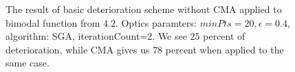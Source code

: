 \begin{figure}
  \centering
  \caption{The result of basic deterioration scheme without CMA 
  applied to bimodal function from $4.2$. Optics paramters: $minPts=20,
  \epsilon=0.4$, algorithm: SGA, iterationCount=2. We see $25$ percent
  of deterioration, while CMA gives us $78$ percent when applied to the same
  case.}
  \label{det3}
\end{figure}

